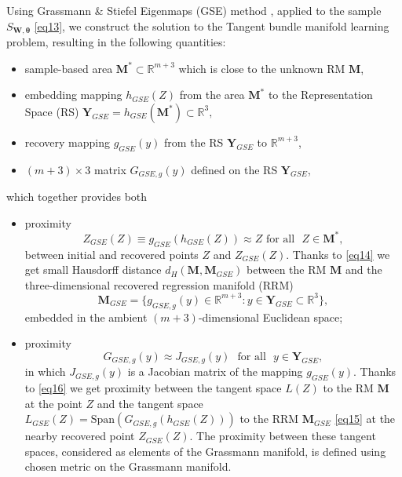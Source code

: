 \documentclass[conference]{IEEEtran} %
\def\mbtheta{{\bm\theta}}
\def\mbM{\mathbf{M}}
\def\mbY{\mathbf{Y}}
\def\RR{\mathbb{R}}
\begin{document}
Using Grassmann \& Stiefel Eigenmaps (GSE) method \cite{bib21,bib22}, applied to the sample $S_{\mathbf{W},\mbtheta}$ \eqref{eq13}, we construct the solution to the Tangent bundle manifold learning problem, resulting in the following quantities: 
\begin{itemize}
	\item 
    	sample-based area $\mbM^* \subset \RR^{m+3}$ which is close to the unknown RM $\mbM$, 
      \item 
      	embedding mapping $h_{GSE}(Z)$ from the area $\mbM^*$ to the Representation Space (RS) $\mbY_{GSE} = h_{GSE}(\mbM^*)\subset\RR^3,$ 
  \item 
  	recovery mapping $g_{GSE}(y)$ from the RS $\mbY_{GSE}$ to $\RR^{m+3}$, 
  \item 
  	$(m+3)\times 3$ matrix $G_{GSE,g}(y)$ defined on the RS $\mbY_{GSE}$, 
\end{itemize}
which together provides both 
\begin{itemize}
\item proximity
\begin{equation}
\label{eq14}
	Z_{GSE}(Z) \equiv g_{GSE}(h_{GSE}(Z)) \approx Z\,\,\mbox{for all }\,\,Z \in \mbM^*,
\end{equation}
between initial and recovered points $Z$ and $Z_{GSE}(Z)$. Thanks to \eqref{eq14} we get small Hausdorff distance $d_H(\mbM, \mbM_{GSE})$ between the RM $\mbM$ and the three-dimensional recovered regression manifold (RRM)
\begin{equation}
\label{eq15}
	\mbM_{GSE} = \{g_{GSE,g}(y) \in \RR^{m+3}: y \in \mbY_{GSE}\subset\RR^3\},
 \end{equation}   
embedded in the ambient $(m+3)$-dimensional Euclidean space; 
\item proximity
\begin{equation}
\label{eq16}
	G_{GSE,g}(y) \approx J_{GSE,g}(y)\,\,\mbox{ for all }\,\, y \in \mbY_{GSE},
\end{equation}
in which $J_{GSE,g}(y)$ is a Jacobian matrix of the mapping $g_{GSE}(y)$. Thanks to \eqref{eq16} we get proximity between the tangent space $L(Z)$ to the RM $\mbM$ at the point $Z$ and the tangent space $L_{GSE}(Z) = \mathrm{Span}(G_{GSE,g}(h_{GSE}(Z)))$ to the RRM $\mbM_{GSE}$ \eqref{eq15} at the nearby recovered point $Z_{GSE}(Z)$. The proximity between these tangent spaces, considered as elements of the Grassmann manifold, is defined using chosen metric on the Grassmann manifold.
\end{itemize}
\end{document}
